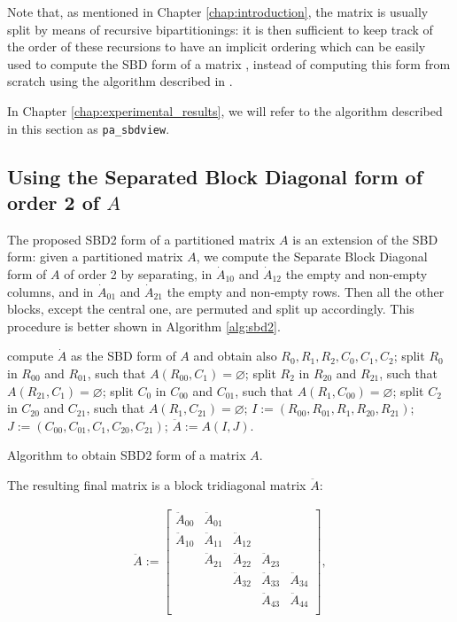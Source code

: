 Note that, as mentioned in Chapter \ref{chap:introduction}, the matrix is usually split by means of recursive bipartitionings: it is then sufficient to keep track of the order of these recursions to have an implicit ordering which can be easily used to compute the SBD form of a matrix \cite{yzelman_cache}, instead of computing this form from scratch using the algorithm described in \cite[Appendix A]{bas}.

In Chapter \ref{chap:experimental_results}, we will refer to the algorithm described in this section as \verb|pa_sbdview|.

\subsection{Using the Separated Block Diagonal form of order 2 of $A$} \label{sec:sbd2}

The proposed SBD2 form of a partitioned matrix $A$ is an extension of the SBD form: given a partitioned matrix $A$, we compute the Separate Block Diagonal form of $A$ of order 2 by separating, in $\dot{A}_{10}$ and $\dot{A}_{12}$ the empty and non-empty columns, and in $\dot{A}_{01}$ and $\dot{A}_{21}$ the empty and non-empty rows. Then all the other blocks, except the central one, are permuted and split up accordingly. This procedure is better shown in Algorithm \ref{alg:sbd2}. 

\begin{algorithm}[h]
	\begin{algorithmic}
		\State compute $\dot{A}$ as the SBD form of $A$ and obtain also $R_0,R_1,R_2,C_0,C_1,C_2$;
		\State split $R_0$ in $R_{00}$ and $R_{01}$, such that $A(R_{00},C_1) = \varnothing$;
		\State split $R_2$ in $R_{20}$ and $R_{21}$, such that $A(R_{21},C_1) = \varnothing$;
		\State split $C_0$ in $C_{00}$ and $C_{01}$, such that $A(R_1,C_{00}) = \varnothing$;
		\State split $C_2$ in $C_{20}$ and $C_{21}$, such that $A(R_1,C_{21}) = \varnothing$;
		\State $I:= (R_{00},R_{01},R_1,R_{20},R_{21})$;
		\State $J:= (C_{00},C_{01},C_1,C_{20},C_{21})$;
		\State $\ddot{A} := A(I,J)$.
	\end{algorithmic}
	\caption{Algorithm to obtain SBD2 form of a matrix $A$.} \label{alg:sbd2}
\end{algorithm} 

The resulting final matrix is a block tridiagonal matrix $\ddot{A}$:

\begin{align}
	\ddot{A} := \begin{bmatrix}
		\ddot{A}_{00} & \ddot{A}_{01} & & & \\
		\ddot{A}_{10} & \ddot{A}_{11} & \ddot{A}_{12} & & \\
		& \ddot{A}_{21} & \ddot{A}_{22} & \ddot{A}_{23} & \\
		& & \ddot{A}_{32} & \ddot{A}_{33} & \ddot{A}_{34} \\
		& & & \ddot{A}_{43} & \ddot{A}_{44} \\
	\end{bmatrix},
	\label{eq:sbd2}
\end{align}

